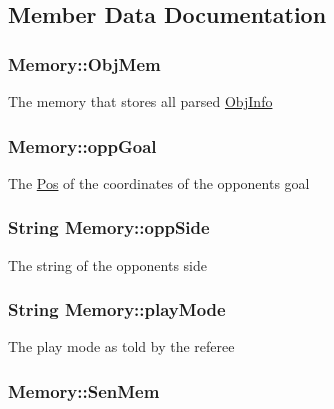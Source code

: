 \subsection{Member Data Documentation}
\hypertarget{classMemory_a0275565eade385f502f6c132f861f11f}{
\subsubsection[{ObjMem}]{ {\bf Memory::ObjMem}}}
\label{classMemory_a0275565eade385f502f6c132f861f11f}
The memory that stores all parsed \hyperlink{classObjInfo}{ObjInfo} \hypertarget{classMemory_afb4aa82077de0c1642e4d3dbf0619615}{
\subsubsection[{oppGoal}]{ {\bf Memory::oppGoal}}}
\label{classMemory_afb4aa82077de0c1642e4d3dbf0619615}
The \hyperlink{classPos}{Pos} of the coordinates of the opponents goal \hypertarget{classMemory_a966a412595e961d93cf7404efda0db9c}{
\subsubsection[{oppSide}]{\setlength{\rightskip}{0pt plus 5cm}String {\bf Memory::oppSide}}}
\label{classMemory_a966a412595e961d93cf7404efda0db9c}
The string of the opponents side \hypertarget{classMemory_a96f2cc811ed87dfd6056fccd9c10ca40}{
\subsubsection[{playMode}]{\setlength{\rightskip}{0pt plus 5cm}String {\bf Memory::playMode}}}
\label{classMemory_a96f2cc811ed87dfd6056fccd9c10ca40}
The play mode as told by the referee \hypertarget{classMemory_a5a5e28abf688e0a18930e5dbdbc807b2}{
\subsubsection[{SenMem}]{ {\bf Memory::SenMem}}}
